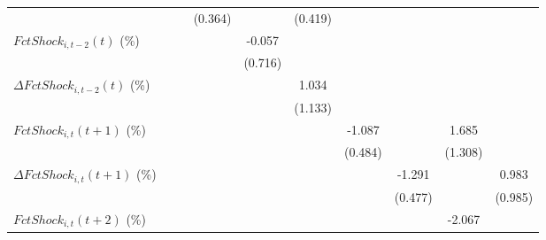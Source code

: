 {\begin{tabular}{l*{9}{c}}
                    &                     &                     &     (0.364)         &                     &     (0.419)         &                     &                     &                     &                     \\
\addlinespace
$ FctShock_{i,t-2}(t)$ (\%)&                     &                     &                     &      -0.057         &                     &                     &                     &                     &                     \\
                    &                     &                     &                     &     (0.716)         &                     &                     &                     &                     &                     \\
\addlinespace
$ \Delta FctShock_{i,t-2}(t)$ (\%)&                     &                     &                     &                     &       1.034         &                     &                     &                     &                     \\
                    &                     &                     &                     &                     &     (1.133)         &                     &                     &                     &                     \\
\addlinespace
$ FctShock_{i,t}(t+1)$ (\%)&                     &                     &                     &                     &                     &      -1.087\sym{**} &                     &       1.685         &                     \\
                    &                     &                     &                     &                     &                     &     (0.484)         &                     &     (1.308)         &                     \\
\addlinespace
$ \Delta FctShock_{i,t}(t+1)$ (\%)&                     &                     &                     &                     &                     &                     &      -1.291\sym{**} &                     &       0.983         \\
                    &                     &                     &                     &                     &                     &                     &     (0.477)         &                     &     (0.985)         \\
\addlinespace
$ FctShock_{i,t}(t+2)$ (\%)&                     &                     &                     &                     &                     &                     &                     &      -2.067\sym{*}  &                     \\

\end{tabular}}

